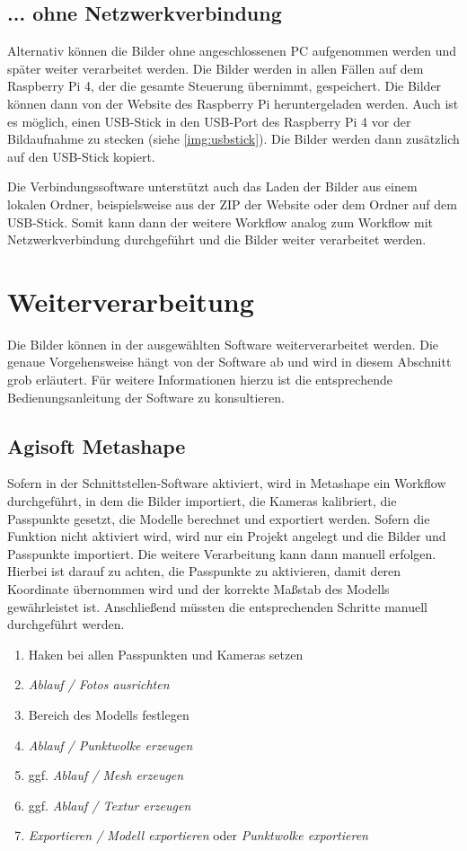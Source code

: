 \documentclass[./00PhotoBox.tex]{subfiles}
\begin{document}
\subsection{... ohne Netzwerkverbindung}
Alternativ können die Bilder ohne angeschlossenen PC aufgenommen werden und später weiter verarbeitet werden. Die Bilder werden in allen Fällen auf dem Raspberry Pi 4, der die gesamte Steuerung übernimmt, gespeichert. Die Bilder können dann von der Website des Raspberry Pi heruntergeladen werden. Auch ist es möglich, einen USB-Stick in den USB-Port des Raspberry Pi 4 vor der Bildaufnahme zu stecken (siehe \autoref{img:usbstick}). Die Bilder werden dann zusätzlich auf den USB-Stick kopiert.

Die Verbindungssoftware unterstützt auch das Laden der Bilder aus einem lokalen Ordner, beispielsweise aus der ZIP der Website oder dem Ordner auf dem USB-Stick. Somit kann dann der weitere Workflow analog zum Workflow mit Netzwerkverbindung durchgeführt und die Bilder weiter verarbeitet werden.

\section{Weiterverarbeitung}
Die Bilder können in der ausgewählten Software weiterverarbeitet werden. Die genaue Vorgehensweise hängt von der Software ab und wird in diesem Abschnitt grob erläutert. Für weitere Informationen hierzu ist die entsprechende Bedienungsanleitung der Software zu konsultieren.

\subsection{Agisoft Metashape}
Sofern in der Schnittstellen-Software aktiviert, wird in Metashape ein Workflow durchgeführt, in dem die Bilder importiert, die Kameras kalibriert, die Passpunkte gesetzt, die Modelle berechnet und exportiert werden. Sofern die Funktion nicht aktiviert wird, wird nur ein Projekt angelegt und die Bilder und Passpunkte importiert. Die weitere Verarbeitung kann dann manuell erfolgen. Hierbei ist darauf zu achten, die Passpunkte zu aktivieren, damit deren Koordinate übernommen wird und der korrekte Maßstab des Modells gewährleistet ist. Anschließend müssten die entsprechenden Schritte manuell durchgeführt werden.

\begin{enumerate}
    \item Haken bei allen Passpunkten und Kameras setzen
    \item \textit{Ablauf / Fotos ausrichten}
    \item Bereich des Modells festlegen
    \item \textit{Ablauf / Punktwolke erzeugen}
    \item ggf. \textit{Ablauf / Mesh erzeugen}
    \item ggf. \textit{Ablauf / Textur erzeugen}
    \item \textit{Exportieren / Modell exportieren} oder \textit{Punktwolke exportieren}
\end{enumerate}
\end{document}
